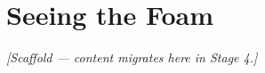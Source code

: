 \chapter{Seeing the Foam}
\label{chap:foam}


\noindent\emph{[Scaffold --- content migrates here in Stage 4.]}
